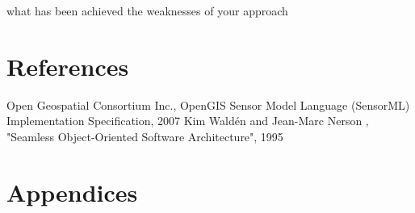 \documentclass[]{final_report}
\begin{document}
what has been achieved
the weaknesses of your approach

\chapter{References}
\newpage
\begin{thebibliography}{99}
Open Geospatial Consortium Inc., OpenGIS Sensor Model Language (SensorML) Implementation Specification, 2007
Kim Waldén and Jean-Marc Nerson , "Seamless Object-Oriented Software Architecture", 1995
\end{thebibliography}
\label{endpage}


\chapter{Appendices}
\end{document}
